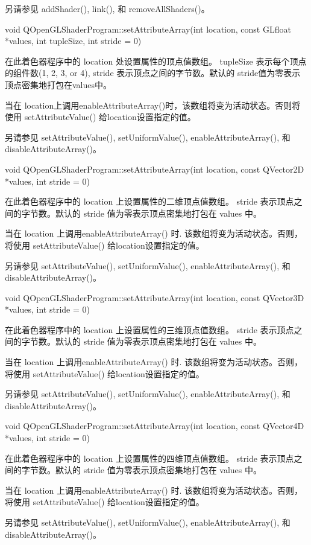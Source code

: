 另请参见 addShader(), link(), 和 removeAllShaders()。

void QOpenGLShaderProgram::setAttributeArray(int location, const GLfloat *values, int tupleSize, int stride = 0)

在此着色器程序中的 location 处设置属性的顶点值数组。 tupleSize 表示每个顶点的组件数(1, 2, 3, or 4), stride 表示顶点之间的字节数。默认的 stride值为零表示顶点密集地打包在values中。

当在 location上调用enableAttributeArray()时，该数组将变为活动状态。否则将使用 setAttributeValue() 给location设置指定的值。

另请参见 setAttributeValue(), setUniformValue(), enableAttributeArray(), 和 disableAttributeArray()。

void QOpenGLShaderProgram::setAttributeArray(int location, const QVector2D *values, int stride = 0)

在此着色器程序中的 location 上设置属性的二维顶点值数组。 stride 表示顶点之间的字节数。默认的 stride 值为零表示顶点密集地打包在 values 中。

当在 location 上调用enableAttributeArray() 时. 该数组将变为活动状态。否则，将使用 setAttributeValue() 给location设置指定的值。

另请参见 setAttributeValue(), setUniformValue(), enableAttributeArray(), 和 disableAttributeArray()。

void QOpenGLShaderProgram::setAttributeArray(int location, const QVector3D *values, int stride = 0)

在此着色器程序中的 location 上设置属性的三维顶点值数组。 stride 表示顶点之间的字节数。默认的 stride 值为零表示顶点密集地打包在 values 中。

当在 location 上调用enableAttributeArray() 时. 该数组将变为活动状态。否则，将使用 setAttributeValue() 给location设置指定的值。

另请参见 setAttributeValue(), setUniformValue(), enableAttributeArray(), 和 disableAttributeArray()。

void QOpenGLShaderProgram::setAttributeArray(int location, const QVector4D *values, int stride = 0)

在此着色器程序中的 location 上设置属性的四维顶点值数组。 stride 表示顶点之间的字节数。默认的 stride 值为零表示顶点密集地打包在 values 中。

当在 location 上调用enableAttributeArray() 时. 该数组将变为活动状态。否则，将使用 setAttributeValue() 给location设置指定的值。

另请参见 setAttributeValue(), setUniformValue(), enableAttributeArray(), 和 disableAttributeArray()。

